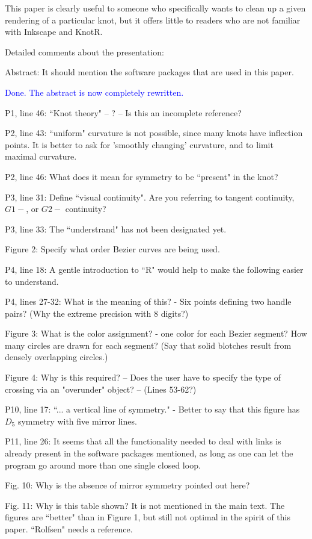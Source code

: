 \documentclass[12pt]{article}
\begin{document}
This paper is clearly useful to someone who specifically wants to
clean up a given rendering of a particular knot, but it offers little
to readers who are not familiar with Inkscape and KnotR.

Detailed comments about the presentation:

Abstract: It should mention the software packages that are used in
this paper.

\textcolor{blue}{Done.  The abstract is now completely rewritten.}

P1, line 46:  ``Knot theory" -- ?  -- Is this an incomplete reference?

P2, line 43: ``uniform" curvature is not possible, since many knots
have inflection points.  It is better to ask for 'smoothly changing'
curvature, and to limit maximal curvature.

P2, line 46: What does it mean for symmetry to be ``present" in the
knot?

P3, line 31: Define ``visual continuity".  Are you referring to tangent
continuity, $G1-$, or $G2-$ continuity?

P3, line 33:  The ``understrand" has not been designated yet.

Figure 2:  Specify what order Bezier curves are being used.

P4, line 18: A gentle introduction to ``R" would help to make the
following easier to understand.

P4, lines 27-32: What is the meaning of this? - Six points defining
two handle pairs?  (Why the extreme precision with 8 digits?)

Figure 3: What is the color assignment? - one color for each Bezier
segment?  How many circles are drawn for each segment?  (Say that
solid blotches result from densely overlapping circles.)

Figure 4: Why is this required?  -- Does the user have to specify the
type of crossing via an "overunder" object?  -- (Lines 53-62?)

P10, line 17: ``... a vertical line of symmetry." - Better to say that
this figure has $D_5$ symmetry with five mirror lines.

P11, line 26: It seems that all the functionality needed to deal with
links is already present in the software packages mentioned, as long
as one can let the program go around more than one single closed loop.

Fig. 10: Why is the absence of mirror symmetry pointed out here?

Fig. 11: Why is this table shown?  It is not mentioned in the main
text.  The figures are ``better" than in Figure 1, but still not
optimal in the spirit of this paper.  ``Rolfsen" needs a reference.
\end{document}
